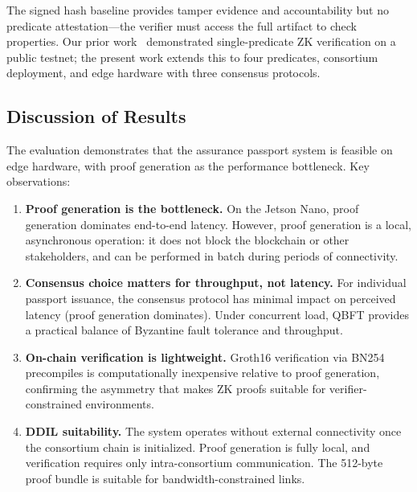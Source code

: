 The signed hash baseline provides tamper evidence and accountability but no predicate attestation---the verifier must access the full artifact to check properties.
Our prior work~\cite{jagannath2025zksnark} demonstrated single-predicate ZK verification on a public testnet; the present work extends this to four predicates, consortium deployment, and edge hardware with three consensus protocols.

\subsection{Discussion of Results}
\label{sec:eval-discussion}

The evaluation demonstrates that the assurance passport system is feasible on edge hardware, with proof generation as the performance bottleneck.
Key observations:

\begin{enumerate}
    \item \textbf{Proof generation is the bottleneck.} On the Jetson Nano, proof generation dominates end-to-end latency. However, proof generation is a local, asynchronous operation: it does not block the blockchain or other stakeholders, and can be performed in batch during periods of connectivity.

    \item \textbf{Consensus choice matters for throughput, not latency.} For individual passport issuance, the consensus protocol has minimal impact on perceived latency (proof generation dominates). Under concurrent load, QBFT provides a practical balance of Byzantine fault tolerance and throughput.

    \item \textbf{On-chain verification is lightweight.} Groth16 verification via BN254 precompiles is computationally inexpensive relative to proof generation, confirming the asymmetry that makes ZK proofs suitable for verifier-constrained environments.

    \item \textbf{DDIL suitability.} The system operates without external connectivity once the consortium chain is initialized. Proof generation is fully local, and verification requires only intra-consortium communication. The 512-byte proof bundle is suitable for bandwidth-constrained links.
\end{enumerate}
